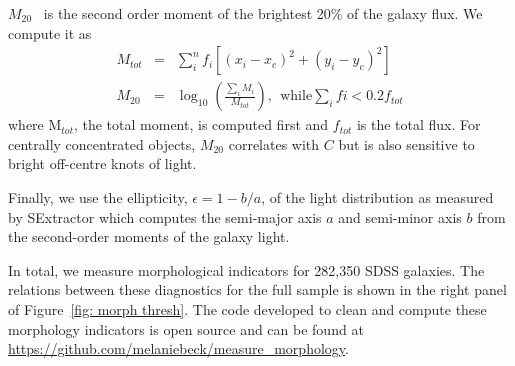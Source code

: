 \documentclass[twocolumn, trackchanges, linenumbers]{aastex6}%
\newcommand\aastex{AAS\TeX}
\newcommand{\M}[1]{$M_{\mathrm{#1}}$}
\begin{document}
\M{20}~\citep{Lotz2004} is the second order moment of the brightest 20\% of the galaxy flux. We compute it as
\begin{eqnarray}
 M_{tot} & = & \sum_i^nf_i[(x_i-x_c)^2 + (y_i-y_c)^2]  \\
 M_{20} & = & \log_{10} (\frac{\sum_iM_i}{M_{tot}}), ~~\textrm{while} \sum_ifi < 0.2f_{tot}
\end{eqnarray}
where M$_{tot}$, the total moment, is computed first and $f_{tot}$ is the total flux. For centrally concentrated objects, \M{20} correlates with $C$ but is also sensitive to bright off-centre knots of light. 

Finally, we use the ellipticity, $\epsilon = 1 - b/a$, of the light distribution as measured by SExtractor which computes the semi-major axis $a$ and semi-minor axis $b$ from the second-order moments of the galaxy light.  

In total, we measure morphological indicators for 282,350 SDSS galaxies. The relations between these diagnostics for the full sample is shown in the right panel of Figure~\ref{fig: morph thresh}. The code developed to clean and compute these morphology indicators is open source and can be found at \url{https://github.com/melaniebeck/measure_morphology}.







\end{document}
